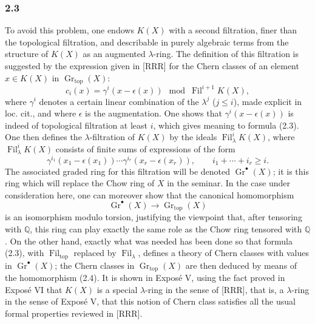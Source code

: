 \documentclass[11pt]{article}
\newcommand{\Gr}{\operatorname{Gr}}
\newcommand{\Fil}{\operatorname{Fil}}
\providecommand{\Gr}{\operatorname{Gr}}
\providecommand{\Gr}{\operatorname{G}}
\begin{document}
\subsubsection*{2.3}
To avoid this problem, one endows $K(X)$ with a second filtration, finer than the topological filtration, and describable in purely algebraic terms from the structure of $K(X)$ as an augmented $\lambda$-ring. The definition of this filtration is suggested by the expression given in [RRR] for the Chern classes of an element $x\in K(X)$ in $\Gr_{\mathrm{top}}(X)$:
\begin{equation}\tag{2.3}
c_i(x)=\gamma^i(x-\epsilon(x))\mod \Fil^{i+1}K(X),
\end{equation}
where $\gamma^i$ denotes a certain linear combination of the $\lambda^j$ ($j\le i$), made explicit in loc. cit., and where $\epsilon$ is the augmentation. One shows that $\gamma^i(x-\epsilon(x))$ is indeed of topological filtration at least $i$, which gives meaning to formula (2.3). One then defines the $\lambda$-filtration of $K(X)$ by the ideals $\Fil^i_\lambda K(X)$, where $\Fil^i_\lambda K(X)$ consists of finite sums of expressions of the form
\[
\gamma^{i_1}(x_1-\epsilon(x_1))\cdots \gamma^{i_r}(x_r-\epsilon(x_r)),\qquad i_1+\cdots+i_r\ge i.
\]
The associated graded ring for this filtration will be denoted $\Gr^\bullet(X)$; it is this ring which will replace the Chow ring of $X$ in the seminar. In the case under consideration here, one can moreover show that the canonical homomorphism
\begin{equation}\tag{2.4}
\Gr^\bullet(X)\longrightarrow \Gr_{\mathrm{top}}(X)
\end{equation}
is an isomorphism modulo torsion, justifying the viewpoint that, after tensoring with $\mathbb Q$, this ring can play exactly the same role as the Chow ring tensored with $\mathbb Q$. On the other hand, exactly what was needed has been done so that formula (2.3), with $\Fil_{\mathrm{top}}$ replaced by $\Fil_\lambda$, defines a theory of Chern classes with values in $\Gr^\bullet(X)$; the Chern classes in $\Gr_{\mathrm{top}}(X)$ are then deduced by means of the homomorphism (2.4). It is shown in Exposé V, using the fact proved in Exposé VI that $K(X)$ is a special $\lambda$-ring in the sense of [RRR], that is, a $\lambda$-ring in the sense of Exposé V, that this notion of Chern class satisfies all the usual formal properties reviewed in [RRR].
\end{document}
